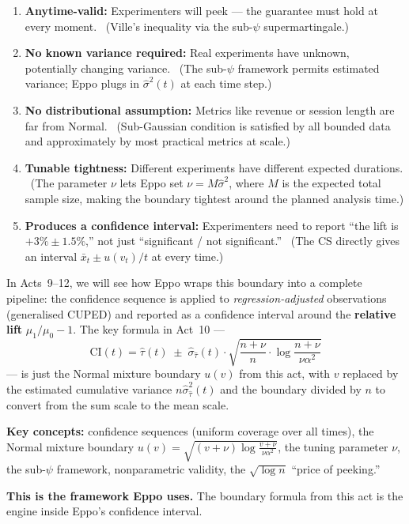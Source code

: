 \documentclass[12pt, a4paper]{article}
\begin{document}
\begin{enumerate}[nosep]
  \item \textbf{Anytime-valid:} Experimenters will peek --- the guarantee must
        hold at every moment.  \checkmark\ (Ville's inequality via the
        sub-$\psi$ supermartingale.)
  \item \textbf{No known variance required:} Real experiments have unknown,
        potentially changing variance.  \checkmark\ (The sub-$\psi$ framework
        permits estimated variance; Eppo plugs in $\hat{\sigma}^2(t)$ at each
        time step.)
  \item \textbf{No distributional assumption:} Metrics like revenue or session
        length are far from Normal.  \checkmark\ (Sub-Gaussian condition is
        satisfied by all bounded data and approximately by most practical
        metrics at scale.)
  \item \textbf{Tunable tightness:} Different experiments have different
        expected durations.  \checkmark\ (The parameter $\nu$ lets Eppo set
        $\nu = M \hat{\sigma}^2$, where $M$ is the expected total sample size,
        making the boundary tightest around the planned analysis time.)
  \item \textbf{Produces a confidence interval:} Experimenters need to report
        ``the lift is $+3\% \pm 1.5\%$,'' not just ``significant / not
        significant.''  \checkmark\ (The CS directly gives an interval
        $\bar{x}_t \pm u(v_t)/t$ at every time.)
\end{enumerate}

In Acts~9--12, we will see how Eppo wraps this boundary into a complete
pipeline: the confidence sequence is applied to \emph{regression-adjusted}
observations (generalised CUPED) and reported as a confidence interval around
the \textbf{relative lift} $\mu_1/\mu_0 - 1$.  The key formula in Act~10 ---
\[
  \text{CI}(t) = \hat{\tau}(t) \;\pm\; \hat{\sigma}_{\hat{\tau}}(t) \cdot
  \sqrt{\frac{n + \nu}{n} \cdot \log\frac{n + \nu}{\nu \alpha^2}}
\]
--- is just the Normal mixture boundary $u(v)$ from this act, with $v$
replaced by the estimated cumulative variance $n \hat{\sigma}_{\hat{\tau}}^2(t)$
and the boundary divided by $n$ to convert from the sum scale to the mean
scale.

\begin{keytakeaway}
\textbf{Key concepts:} confidence sequences (uniform coverage over all times),
the Normal mixture boundary $u(v) = \sqrt{(v+\nu)\log\frac{v+\nu}{\nu\alpha^2}}$,
the tuning parameter $\nu$, the sub-$\psi$ framework, nonparametric validity,
the $\sqrt{\log n}$ ``price of peeking.''

\textbf{This is the framework Eppo uses.}  The boundary formula from this act
is the engine inside Eppo's confidence interval.
\end{keytakeaway}
\end{document}
